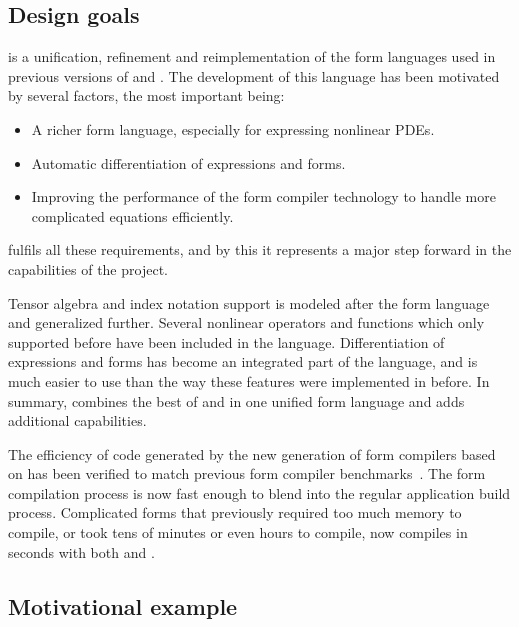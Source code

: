 \subsection{Design goals} \label{ufl:sec:goals}
\ufl{} is a unification, refinement and reimplementation of
the form languages used in previous versions of \ffc{} and \sfc{}.
The development of this language has been motivated by several
factors, the most important being:
\begin{itemize}
\item A richer form language, especially for expressing nonlinear PDEs.
\item Automatic differentiation of expressions and forms.
\item Improving the performance of the form compiler technology to handle more complicated equations efficiently.
\end{itemize}
\ufl{} fulfils all these requirements, and by this it represents
a major step forward in the capabilities of the \fenics{} project.

Tensor algebra and index notation support is modeled after the \ffc{}
form language and generalized further. Several nonlinear operators and
functions which only \sfc{} supported before have been included in the
language.  Differentiation of expressions and forms has become an
integrated part of the language, and is much easier to use than the
way these features were implemented in \sfc{} before.  In summary,
\ufl{} combines the best of \ffc{} and \sfc{} in one unified form
language and adds additional capabilities.

The efficiency of code generated by the new generation of form
compilers based on \ufl{} has been verified to match previous form
compiler benchmarks~\cite{AlnMar2009,OelWel2009}.  The form
compilation process is now fast enough to blend into the regular
application build process.  Complicated forms that previously required
too much memory to compile, or took tens of minutes or even hours to
compile, now compiles in seconds with both \sfc{} and \ffc{}.

\subsection{Motivational example} \label{ufl:sec:example}

